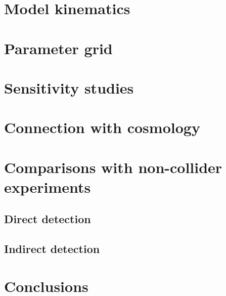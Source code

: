 \documentclass[a4paper, 11pt,notoc]{article}
\begin{document}
\section{Model kinematics}


\section{Parameter grid}


\section{Sensitivity studies}


\section{Connection with cosmology}
\label{sec:relic}


\section{Comparisons with non-collider experiments}
\subsection{Direct detection}

\subsection{Indirect detection}



\section{Conclusions}

 
\end{document}
